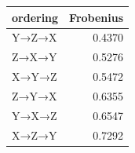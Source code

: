 \begin{tabular}{l r}
\toprule
ordering & Frobenius \\
\midrule
Y→Z→X & 0.4370 \\
Z→X→Y & 0.5276 \\
X→Y→Z & 0.5472 \\
Z→Y→X & 0.6355 \\
Y→X→Z & 0.6547 \\
X→Z→Y & 0.7292 \\
\bottomrule
\end{tabular}
